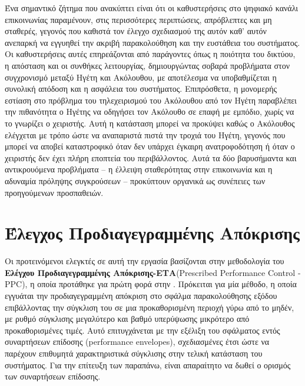 \bigskip
Ένα σημαντικό ζήτημα που ανακύπτει είναι ότι οι καθυστερήσεις στο ψηφιακό κανάλι επικοινωνίας παραμένουν, στις περισσότερες περιπτώσεις, απρόβλεπτες και μη σταθερές, γεγονός που καθιστά τον έλεγχο σχεδιασμού της \cite{BIKAS20239972} αυτόν καθ' αυτόν ανεπαρκή να εγγυηθεί την ακριβή παρακολούθηση και την ευστάθεια του συστήματος. Οι καθυστερήσεις αυτές επηρεάζονται από παράγοντες όπως η ποιότητα του δικτύου, η απόσταση και οι συνθήκες λειτουργίας, δημιουργώντας σοβαρά προβλήματα στον συγχρονισμό μεταξύ Ηγέτη και Ακόλουθου, με αποτέλεσμα να υποβαθμίζεται η συνολική απόδοση και η ασφάλεια του συστήματος. Επιπρόσθετα, η μονομερής εστίαση στο πρόβλημα του τηλεχειρισμού του Ακόλουθου από τον Ηγέτη παραβλέπει την πιθανότητα ο Ηγέτης να οδηγήσει τον Ακόλουθο σε επαφή με εμπόδιο, χωρίς να το γνωρίζει ο χειριστής. Αυτή η κατάσταση μπορεί να προκύψει καθώς ο Ακόλουθος ελέγχεται με τρόπο ώστε να αναπαριστά πιστά την τροχιά του Ηγέτη, γεγονός που μπορεί να αποβεί καταστροφικό όταν δεν υπάρχει έγκαιρη ανατροφοδότηση ή όταν ο χειριστής δεν έχει πλήρη εποπτεία του περιβάλλοντος. Αυτά τα δύο βαρυσήμαντα και αντικρουόμενα προβλήματα – η έλλειψη σταθερότητας στην επικοινωνία και η αδυναμία πρόληψης συγκρούσεων – προκύπτουν οργανικά ως συνέπειες των προηγούμενων προσπαθειών.



\section{Έλεγχος Προδιαγεγραμμένης Απόκρισης} \label{Chapter1Section2}
Οι προτεινόμενοι ελεγκτές σε αυτή την εργασία βασίζονται στην μεθοδολογία του \textbf{Ελέγχου Προδιαγεγραμμένης Απόκρισης-ΕΤΑ}(Prescribed Performance Control - PPC), η οποία προτάθηκε για πρώτη φορά στην \cite{bechlioulis2008robust}. Πρόκειται για μία μέθοδο, η οποία εγγυάται την προδιαγεγραμμένη απόκριση στο σφάλμα παρακολούθησης εξόδου επιβάλλοντας την σύγκλιση του σε μια προκαθορισμένη περιοχή γύρω από το μηδέν, με ρυθμό σύγκλισης μεγαλύτερο και βαθμό υπερύψωσης μικρότερο από προκαθορισμένες τιμές. Αυτό επιτυγχάνεται με την εξέλιξη του σφάλματος εντός συναρτήσεων επίδοσης (performance envelopes), σχεδιασμένες έτσι ώστε να παρέχουν επιθυμητά χαρακτηριστικά σύγκλισης στην τελική κατάσταση του συστήματος. Για την επίτευξη των παραπάνω, είναι απαραίτητο να δωθεί ο ορισμός των συναρτήσεων επίδοσης.

